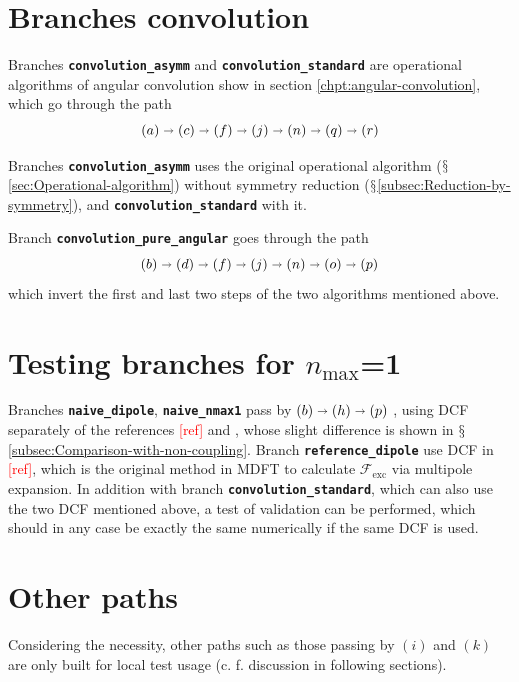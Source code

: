 \section{Branches \textquotedbl{}convolution\textquotedbl{}}

Branches\textbf{ }\texttt{\textbf{convolution\_asymm}} and \texttt{\textbf{convolution\_standard}}
are operational algorithms of angular convolution show in section
\ref{chpt:angular-convolution}, which go through the path 
\[
\left(a\right)\shortrightarrow\left(c\right)\shortrightarrow\left(f\right)\shortrightarrow\left(j\right)\shortrightarrow\left(n\right)\shortrightarrow\left(q\right)\shortrightarrow\left(r\right)
\]

Branches\textbf{ }\texttt{\textbf{convolution\_asymm}} uses the original
operational algorithm ($\mathsection$\ref{sec:Operational-algorithm})
without symmetry reduction ($\mathsection$\ref{subsec:Reduction-by-symmetry}),
and \texttt{\textbf{convolution\_standard}} with it. 

Branch \texttt{\textbf{convolution\_pure\_angular}} goes through the
path 
\[
\left(b\right)\shortrightarrow\left(d\right)\shortrightarrow\left(f\right)\shortrightarrow\left(j\right)\shortrightarrow\left(n\right)\shortrightarrow\left(o\right)\shortrightarrow\left(p\right)
\]
which invert the first and last two steps of the two algorithms mentioned
above.

\section{Testing branches for $n_{\max}$=1}

Branches \texttt{\textbf{naive\_dipole}}, \texttt{\textbf{naive\_nmax1}}
pass by $\left(b\right)\shortrightarrow\left(h\right)\shortrightarrow\left(p\right)$
, using DCF separately of the references \textcolor{red}{{[}ref{]}}
and {\footnotesize{}\citep{puibasset_bridge_2012}}, whose slight
difference is shown in $\mathsection$\ref{subsec:Comparison-with-non-coupling}.
Branch \texttt{\textbf{reference\_dipole}} use DCF in \textcolor{red}{{[}ref{]}},
which is the original method in MDFT to calculate $\mathcal{F}_{\mathrm{exc}}$
via multipole expansion. In addition with branch \texttt{\textbf{convolution\_standard}},
which can also use the two DCF mentioned above, a test of validation
can be performed, which should in any case be exactly the
same numerically if the same DCF is used.

\section{Other paths}

Considering the necessity, other paths such as those passing by $\left(i\right)$
and $\left(k\right)$ are only built for local test usage (c. f. discussion
in following sections).
